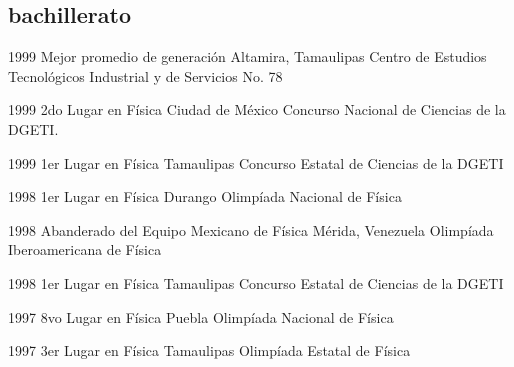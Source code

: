 \documentclass[]{friggeri-cv} %
\begin{document}
\subsection{bachillerato}

\begin{entrylist}

	\entry
	{1999}
	{Mejor promedio de generación}
	{Altamira, Tamaulipas}
	{Centro de Estudios Tecnológicos Industrial y de Servicios No. 78}

	\entry
	{1999}
	{2do Lugar en Física}
	{Ciudad de México}
	{Concurso Nacional de Ciencias de la DGETI.}

	\entry
	{1999}
	{1er Lugar en Física}
	{Tamaulipas}
	{Concurso Estatal de Ciencias de la DGETI}

	\entry
	{1998}
	{1er Lugar en Física}
	{Durango}
	{Olimpíada Nacional de Física}

	\entry
	{1998}
	{Abanderado del Equipo Mexicano de Física}
	{Mérida, Venezuela}
	{Olimpíada Iberoamericana de Física}

	\entry
	{1998}
	{1er Lugar en Física}
	{Tamaulipas}
	{Concurso Estatal de Ciencias de la DGETI}

	\entry
	{1997}
	{8vo Lugar en Física}
	{Puebla}
	{Olimpíada Nacional de Física}

	\entry
	{1997}
	{3er Lugar en Física}
	{Tamaulipas}
	{Olimpíada Estatal de Física}


\end{entrylist}







\end{document}

